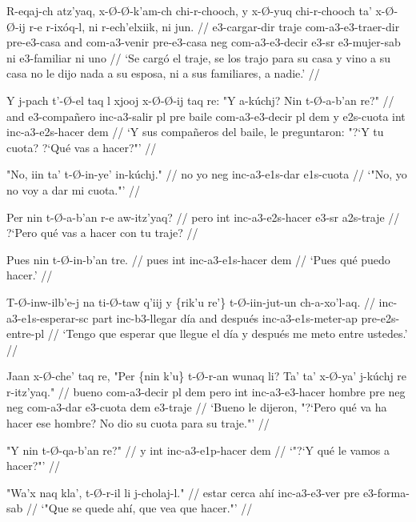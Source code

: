 \documentclass[12pt]{article}
\begin{document}
\ex
\begingl
  \gla R-eqaj-ch atz'yaq, x-\O-\O-k'am-ch chi-r-chooch, y x-\O-yuq chi-r-chooch ta' x-\O-\O-ij r-e r-ix\'oq-l, ni r-ech'elxiik, ni jun. //
  \glb e3-cargar-dir traje com-a3-e3-traer-dir pre-e3-casa and com-a3-venir pre-e3-casa neg com-a3-e3-decir e3-sr e3-mujer-sab ni e3-familiar ni uno //
  \glft `Se carg\'o el traje, se los trajo para su casa y vino a su casa no le dijo nada a su esposa, ni a sus familiares, a nadie.' //
\endgl
\xe

\ex
\begingl
  \gla Y j-pach t'-\O-el taq l xjooj x-\O-\O-ij taq re: "Y a-k\'uchj? Nin t-\O-a-b'an re?" //
  \glb and e3-compa\~nero inc-a3-salir pl pre baile com-a3-e3-decir pl dem y e2s-cuota int inc-a3-e2s-hacer dem  //
  \glft `Y sus compa\~neros del baile, le preguntaron: "?`Y tu cuota? ?`Qu\'e vas a hacer?"' //
\endgl
\xe

\ex
\begingl
  \gla "No, iin ta' t-\O-in-ye' in-k\'uchj." //
  \glb  no yo neg inc-a3-e1s-dar e1s-cuota //
  \glft `"No, yo no voy a dar mi cuota."' //
\endgl
\xe


\ex
\begingl
  \gla  Per nin t-\O-a-b'an r-e aw-itz'yaq? //
  \glb pero int inc-a3-e2s-hacer e3-sr a2s-traje //
  \glft ?`Pero qu\'e vas a hacer con tu traje? //
\endgl
\xe

\ex
\begingl
  \gla  Pues nin t-\O-in-b'an tre. //
  \glb pues int inc-a3-e1s-hacer dem //
  \glft `Pues qu\'e puedo hacer.' //
\endgl
\xe

\ex
\begingl
  \gla  T-\O-inw-ilb'e-j na ti-\O-taw q'iij y \{rik'u re'\} t-\O-iin-jut-un ch-a-xo'l-aq. //
  \glb inc-a3-e1s-esperar-sc part inc-b3-llegar d\'ia and despu\'es inc-a3-e1s-meter-ap pre-e2s-entre-pl  //
  \glft `Tengo que esperar que llegue el d\'ia y despu\'es me meto entre ustedes.' //
\endgl
\xe

\ex
\begingl
  \gla Jaan x-\O-che' taq re, "Per \{nin k'u\} t-\O-r-an wunaq li? Ta' ta' x-\O-ya' j-k\'uchj re r-itz'yaq." //
  \glb bueno com-a3-decir pl dem pero int inc-a3-e3-hacer hombre pre neg neg com-a3-dar e3-cuota dem e3-traje //
  \glft `Bueno le dijeron, "?`Pero qu\'e va ha hacer ese hombre? No dio su cuota para su traje."' //
\endgl
\xe

\ex
\begingl
  \gla "Y nin t-\O-qa-b'an re?" //
  \glb y int inc-a3-e1p-hacer dem //
  \glft `"?`Y qu\'e le vamos a hacer?"' //
\endgl
\xe

\ex
\begingl
  \gla  "Wa'x naq kla', t-\O-r-il li j-cholaj-l." //
  \glb estar cerca ah\'i inc-a3-e3-ver pre e3-forma-sab //
  \glft `"Que se quede ah\'i, que vea que hacer."' //
\endgl
\xe
\end{document}
